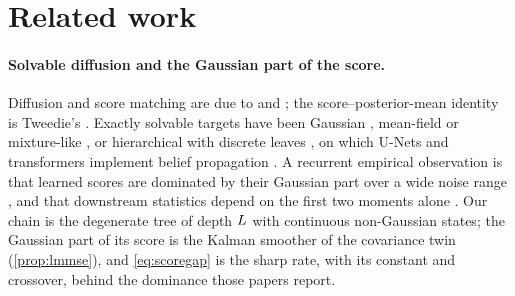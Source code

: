 \section{Related work}
\label{sec:related}

\paragraph{Solvable diffusion and the Gaussian part of the score.}
Diffusion and score matching are due to \citet{sohl2015deep,ho2020denoising,song2021scorebased}
and \citet{hyvarinen2005estimation,vincent2011connection}; the score--posterior-mean identity is
Tweedie's \citep{robbins1956empirical,efron2011tweedie}. Exactly solvable targets have been
Gaussian \citep{pierret2024gaussian}, mean-field or mixture-like
\citep{biroli2023generative,biroli2024dynamical,cui2025solvable}, or hierarchical with discrete
leaves \citep{sclocchi2025phase}, on which U-Nets and transformers implement belief propagation
\citep{mei2024unets,mei2023deep,garnierbrun2024transformers}. A recurrent
empirical observation is that learned scores are dominated by their Gaussian part over a wide
noise range \citep{wang2024gaussian,li2024hidden,kadkhodaie2024generalization,wang2026rmt}, and that
downstream statistics depend on the first two moments alone \citep{ghane2025universality}. Our chain is the degenerate tree of depth $L$ with
continuous non-Gaussian states; the Gaussian part of its score is the Kalman smoother of the
covariance twin (\cref{prop:lmmse}), and \cref{eq:scoregap} is the sharp rate, with its constant and
crossover, behind the dominance those papers report.

